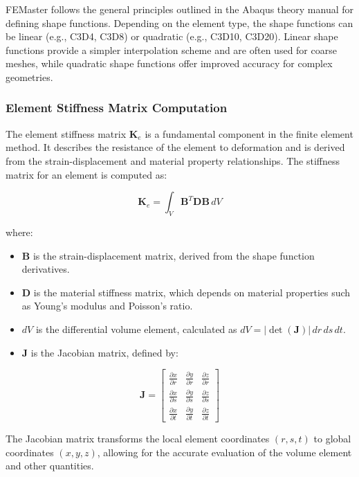 FEMaster follows the general principles outlined in the Abaqus theory manual for defining shape functions. Depending on the element type, the shape functions can be linear (e.g., C3D4, C3D8) or quadratic (e.g., C3D10, C3D20). Linear shape functions provide a simpler interpolation scheme and are often used for coarse meshes, while quadratic shape functions offer improved accuracy for complex geometries.

\subsubsection{Element Stiffness Matrix Computation}

The element stiffness matrix \(\mathbf{K}_e\) is a fundamental component in the finite element method. It describes the resistance of the element to deformation and is derived from the strain-displacement and material property relationships. The stiffness matrix for an element is computed as:

\[
\mathbf{K}_e = \int_{V} \mathbf{B}^T \mathbf{D} \mathbf{B} \, dV
\]

where:
\begin{itemize}
    \item \( \mathbf{B} \) is the strain-displacement matrix, derived from the shape function derivatives.
    \item \( \mathbf{D} \) is the material stiffness matrix, which depends on material properties such as Young's modulus and Poisson's ratio.
    \item \( dV \) is the differential volume element, calculated as \( dV = \left| \det(\mathbf{J}) \right| \, dr \, ds \, dt \).
    \item \( \mathbf{J} \) is the Jacobian matrix, defined by:
\end{itemize}

\[
\mathbf{J} =
\begin{bmatrix}
\frac{\partial x}{\partial r} & \frac{\partial y}{\partial r} & \frac{\partial z}{\partial r} \\
\frac{\partial x}{\partial s} & \frac{\partial y}{\partial s} & \frac{\partial z}{\partial s} \\
\frac{\partial x}{\partial t} & \frac{\partial y}{\partial t} & \frac{\partial z}{\partial t}
\end{bmatrix}
\]

The Jacobian matrix transforms the local element coordinates \((r, s, t)\) to global coordinates \((x, y, z)\), allowing for the accurate evaluation of the volume element and other quantities.

